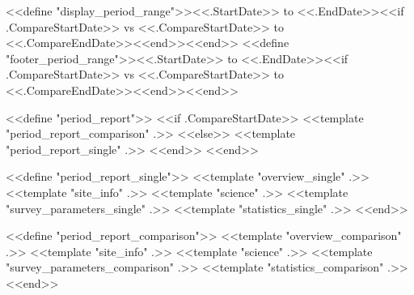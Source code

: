 <<define "display_period_range">><<.StartDate>> to <<.EndDate>><<if .CompareStartDate>> vs <<.CompareStartDate>> to <<.CompareEndDate>><<end>><<end>>
<<define "footer_period_range">><<.StartDate>> to <<.EndDate>><<if .CompareStartDate>> vs <<.CompareStartDate>> to <<.CompareEndDate>><<end>><<end>>

<<define "period_report">>
<<if .CompareStartDate>>
<<template "period_report_comparison" .>>
<<else>>
<<template "period_report_single" .>>
<<end>>
<<end>>

<<define "period_report_single">>
<<template "overview_single" .>>
<<template "site_info" .>>
<<template "science" .>>
<<template "survey_parameters_single" .>>
<<template "statistics_single" .>>
<<end>>

<<define "period_report_comparison">>
<<template "overview_comparison" .>>
<<template "site_info" .>>
<<template "science" .>>
<<template "survey_parameters_comparison" .>>
<<template "statistics_comparison" .>>
<<end>>
